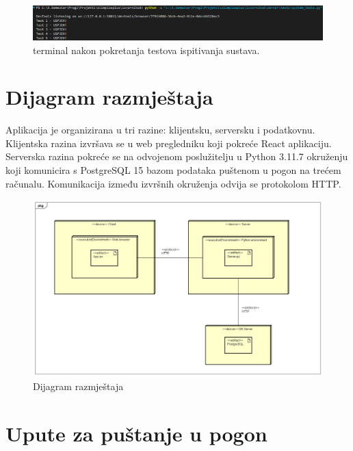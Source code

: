 \begin{figure}[htp]
    \includegraphics[scale=0.35]{dijagrami/terminal_screen.png}
    \centering
    \caption{terminal nakon pokretanja testova ispitivanja sustava.}
    
\end{figure}

\clearpage

\eject

		
		\section{Dijagram razmještaja}

        Aplikacija je organizirana u tri razine: klijentsku, serversku i podatkovnu. Klijentska razina izvršava se u web pregledniku koji pokreće React aplikaciju. Serverska razina pokreće se na odvojenom poslužitelju u Python 3.11.7 okruženju koji komunicira s PostgreSQL 15 bazom podataka puštenom u pogon na trećem računalu. Komunikacija između izvršnih okruženja odvija se protokolom HTTP.
			
		\begin{figure}[htp]
			\includegraphics[scale=0.35]{dijagrami/DeploymentDiagram0.png}
			\centering
			\caption{Dijagram razmještaja}
		\end{figure}

        \eject
		
		\section{Upute za puštanje u pogon}


